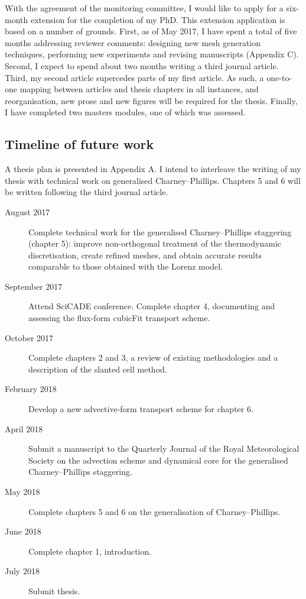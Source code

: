 \documentclass[a4paper,11pt]{article}
\begin{document}
With the agreement of the monitoring committee, I would like to apply for a six-month extension for the completion of my PhD.  This extension application is based on a number of grounds.
First, as of May 2017, I have spent a total of five months addressing reviewer comments: designing new mesh generation techniques, performing new experiments and revising manuscripts (Appendix C).
Second, I expect to spend about two months writing a third journal article.
Third, my second article supercedes parts of my first article.  As such, a one-to-one mapping between articles and thesis chapters in all instances, and reorganisation, new prose and new figures will be required for the thesis.
Finally, I have completed two masters modules, one of which was assessed.

\subsection*{Timeline of future work}

A thesis plan is presented in Appendix A.  I intend to interleave the writing of my thesis with technical work on generalised Charney--Phillips.  Chapters 5 and 6 will be written following the third journal article.

\begin{description}
	\item[August 2017]{Complete technical work for the generalised Charney--Phillips staggering (chapter 5): improve non-orthogonal treatment of the thermodynamic discretisation, create refined meshes, and obtain accurate results comparable to those obtained with the Lorenz model.}
	\item[September 2017]{Attend SciCADE conference.  Complete chapter 4, documenting and assessing the flux-form cubicFit transport scheme.}
	\item[October 2017]{Complete chapters 2 and 3, a review of existing methodologies and a description of the slanted cell method.}
	\item[February 2018]{Develop a new advective-form transport scheme for chapter 6.}
	\item[April 2018]{Submit a manuscript to the Quarterly Journal of the Royal Meteorological Society on the advection scheme and dynamical core for the generalised Charney--Phillips staggering.}
	\item[May 2018]{Complete chapters 5 and 6 on the generalisation of Charney--Phillips.}
	\item[June 2018]{Complete chapter 1, introduction.}
	\item[July 2018]{Submit thesis.}
\end{description}
\end{document}

